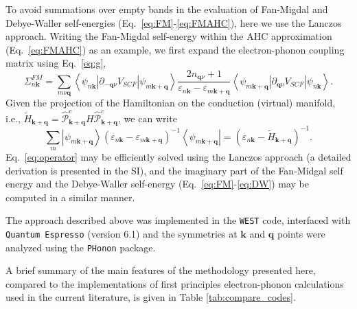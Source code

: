 \documentclass[journal=jctcce,manuscript=article]{achemso}
\newcommand{\bfk}{{\mathbf{k}}}
\newcommand{\bfq}{{\mathbf{q}}}
\begin{document}
To avoid summations over empty bands in the evaluation of Fan-Migdal and Debye-Waller self-energies (Eq.~\ref{eq:FM}-\ref{eq:FMAHC}), here we use the Lanczos approach. Writing  the Fan-Migdal self-energy within the AHC approximation (Eq.~\ref{eq:FMAHC}) as an example, we first expand the electron-phonon coupling matrix using Eq.~\ref{eq:g},
\begin{equation}
    \Sigma_{n\bfk}^{FM} = \sum_{m\nu\bfq}
    \left\langle\psi_{n\bfk}\left|\partial_{-\bfq\nu}V_{SCF} \right|\psi_{m\bfk+\bfq} \right\rangle \frac{2n_{\bfq\nu}+1}{\varepsilon_{n\bfk}-\varepsilon_{m\bfk+\bfq}}
    \left\langle \psi_{m\bfk+\bfq}\left|\partial_{\bfq\nu}V_{SCF}\right|\psi_{n\bfk} \right\rangle.
\end{equation}
Given the projection of the Hamiltonian on the conduction (virtual) manifold, i.e., $\tilde{H}_{\bfk+\bfq}=\hat{\mathcal{P}}_{\bfk+\bfq}^c H\hat{\mathcal{P}}^c_{\bfk+\bfq}$, we can write
\begin{equation}
    \sum_{m}\left|\psi_{m\bfk+\bfq}\right\rangle (\varepsilon_{n\bfk}-\varepsilon_{m\bfk+\bfq})^{-1}\left\langle\psi_{m\bfk+\bfq}\right| = (\varepsilon_{n\bfk}-\tilde{H}_{\bfk+\bfq})^{-1}.
    \label{eq:operator}
\end{equation}
Eq.~\ref{eq:operator} may be efficiently solved using the Lanczos approach (a detailed derivation is presented in the SI), and the imaginary part of the Fan-Midgal self energy and the Debye-Waller self-energy (Eq.~\ref{eq:FM}-\ref{eq:DW}) may be computed  in a similar manner. 

The approach described above was implemented in the \texttt{WEST} code\cite{govoni2015large,mcavoy2018coupling}, interfaced with \texttt{Quantum Espresso} (version 6.1)\cite{giannozzi2009quantum} and the symmetries at $\bfk$ and $\bfq$ points were analyzed using the \texttt{PHonon} package\cite{giannozzi2009quantum}.

A brief summary of the main features of the methodology presented here, compared to the implementations of first principles electron-phonon calculations used in the current literature, is given in Table \ref{tab:compare_codes}. 
\end{document}
